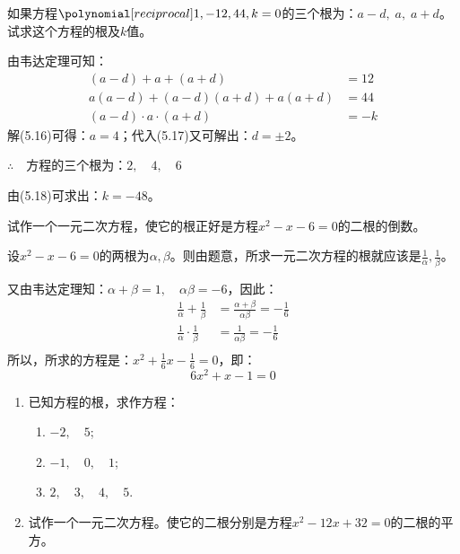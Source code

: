 \begin{example}
    如果方程$\poly{1,-12,44,k}=0$的三个根为：$a-d,\; a,\; a+d$。试求这个方程的根及$k$值。
\end{example}

\begin{solution}
    由韦达定理可知：
\begin{align}
(a-d)+a+(a+d)&=12\\
a(a-d)+(a-d)(a+d)+a(a+d)&=44\\
(a-d)\cdot a\cdot (a+d)&=-k
\end{align}
解(5.16)可得：$a=4$；代入(5.17)又可解出：$d=\pm 2$。

$\therefore\quad $方程的三个根为：$2,\quad 4,\quad 6$

由(5.18)可求出：$k=-48$。
\end{solution}

\begin{example}
试作一个一元二次方程，使它的根正好是方程$x^2-x-6=0$的二根的倒数。
\end{example}


\begin{solution}
设$x^2-x-6=0$的两根为$\alpha,\beta$。则由题意，所求一元二次方程的根就应该是$\frac{1}{\alpha},\frac{1}{\beta}$。

又由韦达定理知：$\alpha+\beta=1,\quad \alpha\beta=-6$，因此：
\[\begin{split}
    \frac{1}{\alpha}+\frac{1}{\beta}&=\frac{\alpha+\beta}{\alpha\beta}=-\frac{1}{6}\\
    \frac{1}{\alpha}\cdot \frac{1}{\beta}&=\frac{1}{\alpha\beta}=-\frac{1}{6}\\
\end{split}\]
所以，所求的方程是：$x^2+\frac{1}{6}x-\frac{1}{6}=0$，即：
\[ 6x^2+x-1=0 \]
\end{solution}


\begin{ex}
\begin{enumerate}
    \item 已知方程的根，求作方程：
    \begin{enumerate}
        \item $-2,\quad  5$;
        \item $-1,\quad 0,\quad 1$;
        \item $2,\quad 3,\quad 4,\quad 5$.
    \end{enumerate}
    \item 试作一个一元二次方程。使它的二根分别是方程$x^2-12x+32=0$的二根的平方。
\end{enumerate}
\end{ex}

